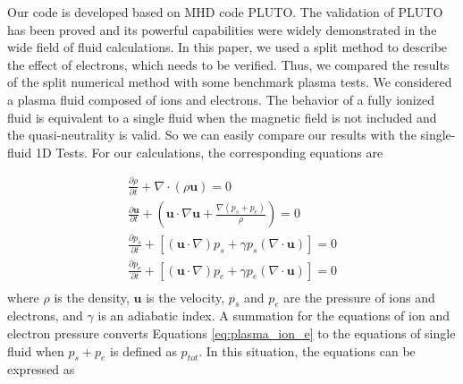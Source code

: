 \documentclass[journal, onecolumn]{aastex631}
\begin{document}
\begin{CJK*}{UTF8}{gbsn}
\begin{appendix}
Our code is developed based on MHD code PLUTO. The validation of PLUTO has been proved \citep{Mignone2007} and its powerful capabilities were widely demonstrated in the wide field of fluid calculations. In this paper, we used a split method to describe the effect of electrons, which needs to be verified. Thus, we compared the results of the split numerical method with some benchmark plasma tests. We considered a plasma fluid composed of ions and electrons. The behavior of a fully ionized fluid is equivalent to a single fluid when the magnetic field is not included and the quasi-neutrality is valid. So we can easily compare our results with the single-fluid 1D Tests. For our calculations, the corresponding equations are

\begin{equation}\label{eq:plasma_ion_e}
\begin{matrix}
\frac{\partial{\rho}}{\partial{t}} + \nabla\cdot(\rho\textbf{u}) = 0\\
\frac{\partial{\textbf{u}}}{\partial{t}}+(\textbf{u}\cdot\nabla\textbf{u}+\frac{\nabla(p_{s}+p_{e})}{\rho})=0\\
\frac{\partial{p_s}}{\partial{t}}+[(\textbf{u}\cdot\nabla)p_{s}+\gamma p_{s}(\nabla\cdot\textbf{u}) ] = 0\\
\frac{\partial{p_e}}{\partial{t}}+[(\textbf{u}\cdot\nabla)p_{e}+\gamma p_{e}(\nabla\cdot\textbf{u}) ] = 0\\                                                                                                                                                                                                                                                                                                                                                                                   \end{matrix}
\end{equation}
where $\rho$ is the density, $\textbf{u}$ is the velocity, $p_s$ and $p_e$ are the pressure of ions and electrons, and $\gamma$ is an adiabatic index. A summation for the equations of ion and electron pressure converts Equations \ref{eq:plasma_ion_e} to the equations of single fluid when $p_{s} + p_{e}$ is defined as $p_{tot}$. In this situation, the equations can be expressed as


\end{appendix}
\end{CJK*}
\end{document}
